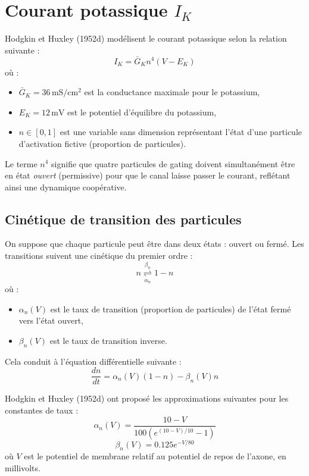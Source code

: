 \section{Courant potassique $I_K$}

Hodgkin et Huxley (1952d) modélisent le courant potassique selon la relation suivante :
\begin{equation}
I_K = \bar{G}_K n^4 (V - E_K)
\label{eq:1}
\end{equation}
où :
\begin{itemize}
	\item $\bar{G}_K = 36 \, \text{mS}/\text{cm}^2$ est la conductance maximale pour le potassium,
	\item $E_K = 12 \, \text{mV}$ est le potentiel d'équilibre du potassium,
	\item $n \in [0,1]$ est une variable sans dimension représentant l'état d'une particule d'activation fictive (proportion de particules).
\end{itemize}
Le terme $n^4$ signifie que quatre particules de gating doivent simultanément être en état \textit{ouvert} (permissive) pour que le canal laisse passer le courant, reflétant ainsi une dynamique coopérative.

\subsection{Cinétique de transition des particules}

On suppose que chaque particule peut être dans deux états : ouvert ou fermé. Les transitions suivent une cinétique du premier ordre :
\begin{equation}
n \underset{\alpha_n}{\overset{\beta_n}{\rightleftharpoons}} 1 - n
\label{eq:2}
\end{equation}
où :
\begin{itemize}
	\item $\alpha_n(V)$ est le taux de transition (proportion de particules) de l'état fermé vers l'état ouvert,
	\item $\beta_n(V)$ est le taux de transition inverse.
\end{itemize}
Cela conduit à l'équation différentielle suivante :
\begin{equation}
\frac{dn}{dt} = \alpha_n(V)(1 - n) - \beta_n(V) n
\label{eq:3}
\end{equation}

Hodgkin et Huxley (1952d) ont proposé les approximations suivantes pour les constantes de taux :
\begin{equation}
\alpha_n(V) = \frac{10 - V}{100(e^{(10 - V)/10} - 1)}     \label{eq:4}
\end{equation}
\begin{equation}
\beta_n(V) = 0.125e^{-V/80}     \label{eq:5}
\end{equation}
où $V$ est le potentiel de membrane relatif au potentiel de repos de l'axone, en millivolts.

